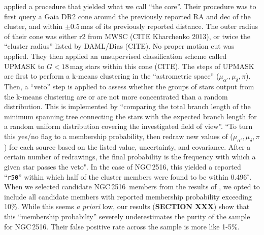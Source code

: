\documentclass[12pt,twocolumn,tighten]{aastex63}
\newcommand{\cn}{NGC\,2516} %
\begin{document}
%
%
 applied a procedure that 
yielded what we call ``the core''.  Their procedure was to first query
a Gaia DR2 cone around the previously reported RA and dec of the
cluster, and within $\pm 0.5$\,mas of its previously reported
distance. 
The outer radius of their cone was either r2 from MWSC (CITE
Kharchenko 2013), or twice the ``cluster radius'' listed by DAML/Dias (CITE).  No
proper motion cut was applied.  They then applied an unsupervised
classification scheme called UPMASK to $G<18$\,mag stars within this
cone (CITE).  The steps of UPMASK are first to perform a k-means
clustering in the ``astrometric space'' ($\mu_{\alpha'}, \mu_\delta,
\pi$).  Then, a ``veto'' step is applied to assess whether the groups
of stars output from the k-means clustering are or are not more
concentrated than a random distribution.  This is implemented by
``comparing the total branch length of the minimum spanning tree
connecting the stars with the expected branch length for a random
uniform distribution covering the investigated field of view''.  ``To
turn this yes/no flag to a membership probability,
\citet{cantatgaudin_gaia_2018} then redraw new values of
($\mu_{\alpha'}, \mu_\delta, \pi$) for each source based on the listed
value, uncertainty, and covariance.  After a certain number of
redrawings, the final probability is the frequency with which a given
star passes the veto".  In the case of \cn, this yielded a reported
``\texttt{r50}'' within which half of the cluster members were found
to be within 0.496$^\circ$.
When we selected candidate \cn\ members from the results of
, we opted to include all candidate members
with reported membership probability exceeding 10\%.
While this seems {\it a priori} low, our results ({\bf SECTION XXX})
show that this ``membership probabilty'' severely underestimates the
purity of the  sample for \cn. 
Their false positive rate across the sample is more like 1-5\%.
\end{document}

